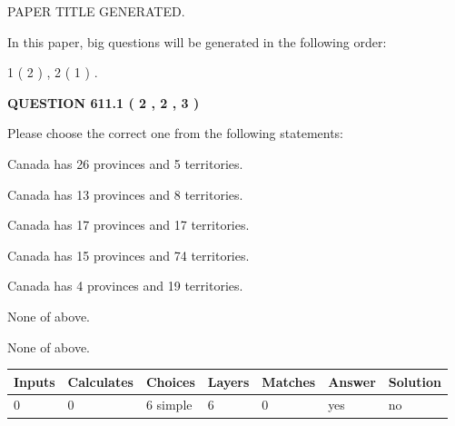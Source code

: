 \documentclass[12pt]{article}
\begin{document}
   
\vspace{0.2in}
   
   
   
   
   
   
   
   
 \vspace{0.2in}
 
 
 
 
   
   
 PAPER TITLE GENERATED.
   
   
   
\vspace{0.2in}
   
In this paper, big questions will be generated in the following order: 
   
   
   1 ( 2 )
 ,
   2 ( 1 )
 .
  
\vspace{0.2in}
  
{\textbf{\Large{QUESTION
611.1 
 ( 2 , 2 , 3 )
}}}
  
  
Please choose the correct one from the following statements:
 
 
Canada has  26 provinces and  5 territories.
 
 
Canada has  13 provinces and  8 territories.
 
 
Canada has  17 provinces and  17 territories.
 
 
Canada has  15 provinces and  74 territories.
 
 
Canada has   4 provinces and  19 territories.
 
 
 None of above.
 
 
\noindent{}
 
 
 None of above.
 
 
\noindent{}
 
 
   
   
   
   
\noindent\begin{tabular}{|l|l|l|l|l|l|l|}
 \hline
Inputs & Calculates & Choices & Layers & Matches & Answer & Solution \\ \hline
 0  & 
 0  & 
 6
  simple  
  & 
 6  & 
 0  & 
  yes & 
  no 
  \\ \hline
 \end{tabular}
   
\end{document}

